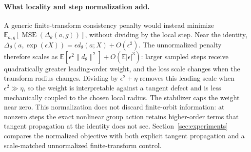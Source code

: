 \paragraph{What locality and step normalization add.}
A generic finite-transform consistency penalty would instead minimize
\(\mathbb E_{a,g}[\operatorname{MSE}(\Delta_\theta(a,g))]\), without dividing
by the local step.  Near the identity,
\(\Delta_\theta(a,\exp(\epsilon X))=\epsilon d_\theta(a;X)+O(\epsilon^2)\).
The unnormalized penalty therefore scales as
\(\mathbb E[\epsilon^2\lVert d_\theta\rVert^2]+O(\mathbb E|\epsilon|^3)\):
larger sampled steps receive quadratically greater leading-order weight, and the
loss scale changes when the transform radius changes.  Dividing by
\(\epsilon^2+\eta\) removes this leading scale when \(\epsilon^2\gg\eta\), so
the weight is interpretable against a tangent defect and is less mechanically
coupled to the chosen local radius.  The stabilizer caps the weight near zero.
This normalization does not discard finite-orbit information: at nonzero steps
the exact nonlinear group action retains higher-order terms that tangent
propagation at the identity does not see.  Section~\ref{sec:experiments} compares
the normalized objective with both explicit tangent propagation and a
scale-matched unnormalized finite-transform control.

